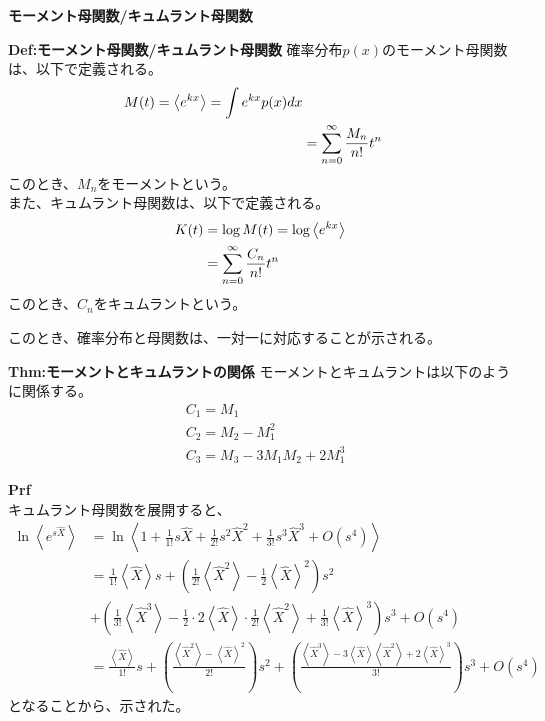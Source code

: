 \documentclass[a4paper,11pt]{jsarticle}
\numberwithin{equation}{section}
\begin{document}
\textbf{モーメント母関数/キュムラント母関数}\\
\begin{itembox}[l]{\textbf{Def:モーメント母関数/キュムラント母関数}}
  確率分布$p(x)$のモーメント母関数は、以下で定義される。
  \begin{align}
    M(t) = \expval{e^{kx}} = \int e^{kx} p(x) dx \label{eq:moment}\\
    &= \sum_{n=0}^{\infty} \frac{M_n}{n!} t^n
  \end{align}
  このとき、$M_n$をモーメントという。\\
  また、キュムラント母関数は、以下で定義される。
  \begin{align}
    K(t) &= \log M(t) = \log \expval{e^{kx}} \label{eq:cumulant}\\
    &= \sum_{n=0}^{\infty} \frac{C_n}{n!} t^n
  \end{align}
  このとき、$C_n$をキュムラントという。
\end{itembox}
このとき、確率分布と母関数は、一対一に対応することが示される。\\

\begin{itembox}[l]{\textbf{Thm:モーメントとキュムラントの関係}}
  モーメントとキュムラントは以下のように関係する。
  \begin{align}
    &C_1 = M_1\\
    &C_2 = M_2 - M_1^2\label{eq:cumulant2}\\
    &C_3 = M_3 - 3M_1M_2 + 2M_1^3
  \end{align}
\end{itembox}
\textbf{Prf}\\
キュムラント母関数を展開すると、
\begin{align}
  \ln \left\langle e^{s\hat{X}} \right\rangle &= \ln \left\langle 1 + \frac{1}{1!}s\hat{X} + \frac{1}{2!}s^2\hat{X}^2 + \frac{1}{3!}s^3\hat{X}^3 + O(s^4) \right\rangle \nonumber \\
  &= \frac{1}{1!} \left\langle \hat{X} \right\rangle s + \left( \frac{1}{2!} \left\langle \hat{X}^2 \right\rangle - \frac{1}{2} \left\langle \hat{X} \right\rangle^2 \right) s^2 \\
  &+ \left( \frac{1}{3!} \left\langle \hat{X}^3 \right\rangle - \frac{1}{2} \cdot 2 \left\langle \hat{X} \right\rangle \cdot \frac{1}{2!} \left\langle \hat{X}^2 \right\rangle + \frac{1}{3!} \left\langle \hat{X} \right\rangle^3 \right) s^3 + O(s^4) \nonumber \\
  &= \frac{\left\langle \hat{X} \right\rangle}{1!} s + \left( \frac{\left\langle \hat{X}^2 \right\rangle - \left\langle \hat{X} \right\rangle^2}{2!} \right) s^2 + \left( \frac{\left\langle \hat{X}^3 \right\rangle - 3 \left\langle \hat{X} \right\rangle \left\langle \hat{X}^2 \right\rangle + 2 \left\langle \hat{X} \right\rangle^3}{3!} \right) s^3 + O(s^4)
\end{align}
となることから、示された。\hfill\qedsymbol\\
\end{document}
